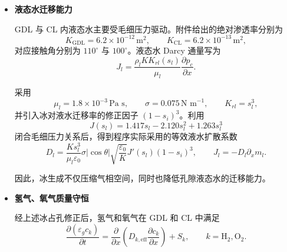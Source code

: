 \documentclass[bwprint]{gmcmthesis}
\numberwithin{figure}{section}
\begin{document}
\begin{itemize}
冰在阴极催化层内还会覆盖反应活性位点。根据附件给出的阴极冰覆盖指数 \(n_{\text{ice}} = 3.5\)，定义局部有效电化学反应面积为
\begin{equation}
a_{\text{ec}}(x,t) = a_0[1 - s_i(x,t)]^{3.5}, \qquad x \in \Omega_{\text{cCL}}. \tag{4-46}
\end{equation}

 考虑冰分布在催化层内可能存在空间差异，先对局部面积修正因子沿 cCL 厚度进行平均，再用于修正整电池交换电流密度：
\begin{equation}
f_a = \frac{1}{L_{\text{cCL}}} \int_{\text{cCL}} (1 - s_i)^{3.5} \, \mathrm{d}x, \qquad j_{0,\text{eff}} = j_0(T_{\text{cCL}}) f_a. \tag{4-47}
\end{equation}

 由于非线性关系的存在，
\[
\langle (1 - s_i)^{3.5} \rangle \neq (1 - \langle s_i \rangle)^{3.5},
\]
因此模型直接根据局部冰状态计算有效面积，而不以平均冰饱和度代替局部修正。

\item \textbf {液态水迁移能力}

GDL 与 CL 内液态水主要受毛细压力驱动。附件给出的绝对渗透率分别为
\[
K_{\text{GDL}} = 6.2 \times 10^{-12} \, \text{m}^2, \qquad K_{\text{CL}} = 6.2 \times 10^{-13} \, \text{m}^2,
\]
对应接触角分别为 \(110^\circ\) 与 \(100^\circ\)。液态水 Darcy 通量写为
\begin{equation}
J_l = \frac{\rho_l K K_{rl}(s_l)}{\mu_l} \frac{\partial p_c}{\partial x}. \tag{4-48}
\end{equation}

采用
\[
\mu_l = 1.8 \times 10^{-3} \, \text{Pa s}, \qquad \sigma = 0.075 \, \text{N m}^{-1}, \qquad K_{rl} = s_l^3,
\]
并引入冰对液水迁移率的修正因子 \((1 - s_i)^3\)。利用
\begin{equation}
J(s_l) = 1.417s_l - 2.120s_l^2 + 1.263s_l^3 \tag{4-49}
\end{equation}
闭合毛细压力关系后，得到程序实际采用的等效液水扩散系数
\begin{equation}
D_l = \frac{K s_l^3}{\mu_l \varepsilon_0} \sigma |\cos \theta| \sqrt{\frac{\varepsilon_0}{K}} J'(s_l)(1 - s_i)^3, \qquad J_l = -D_l \partial_x m_l. \tag{4-50}
\end{equation}

因此，冰生成不仅压缩气相空间，同时也降低孔隙液态水的迁移能力。

\item \textbf {氢气、氧气质量守恒}

经上述冰占孔修正后，氢气和氧气在 GDL 和 CL 中满足
\begin{equation}
\frac{\partial(\varepsilon_g c_k)}{\partial t} = \frac{\partial}{\partial x} \left( D_{k,\text{eff}} \frac{\partial c_k}{\partial x} \right) + S_k, \qquad k = \text{H}_2, \text{O}_2. \tag{4-51}
\end{equation}


\end{itemize}
\end{document}
